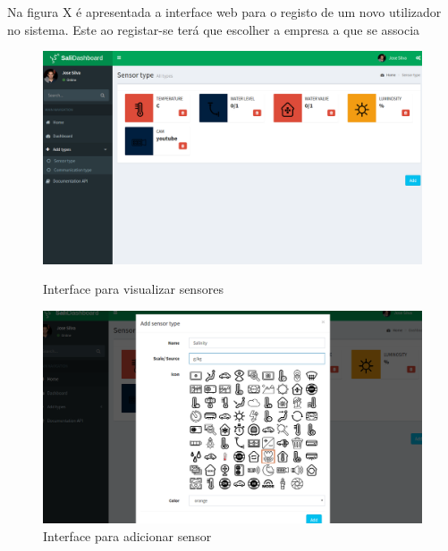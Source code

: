 Na figura X é apresentada a interface web para o registo de um novo utilizador no sistema.  Este ao registar-se terá que escolher a empresa a que se associa



\begin{figure}[h]
	\centering
	\begin{minipage}[b]{0.49\textwidth}
		\centering
		\includegraphics[width=\textwidth]{prints-web/sensor_show.png}
		\caption{Interface para visualizar sensores}
		\label{bluetth05-res}
	\end{minipage}
	\hfill
	\begin{minipage}[b]{0.49\textwidth}
		\centering
		\includegraphics[width=\textwidth]{prints-web/sensor_add.png}
		\caption{ Interface para adicionar sensor}
		\label{comimageesquema}
	\end{minipage}
\end{figure}







